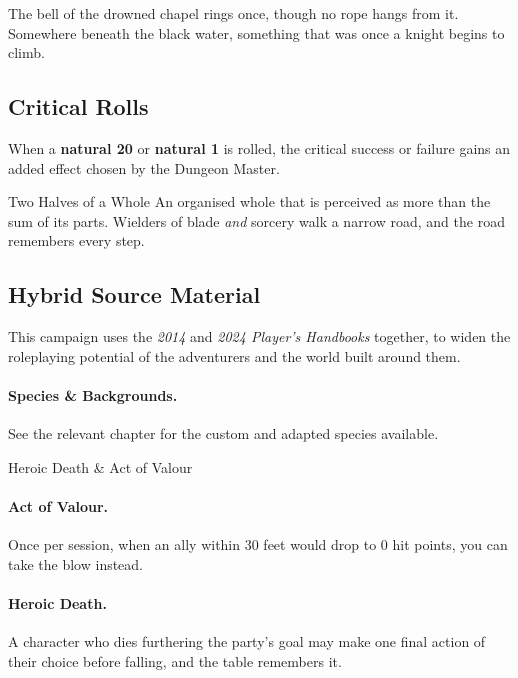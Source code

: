 \documentclass{apotheosis-book} %
\begin{document}
\begin{segment}
\begin{readaloud}
  The bell of the drowned chapel rings once, though no rope hangs from it.
  Somewhere beneath the black water, something that was once a knight
  begins to climb.
\end{readaloud}

\subsection{Critical Rolls}
When a \textbf{natural 20} or \textbf{natural 1} is rolled, the critical
success or failure gains an added effect chosen by the Dungeon Master.


\begin{sidebar}{Two Halves of a Whole}
  An organised whole that is perceived as more than the sum of its parts.
  Wielders of blade \emph{and} sorcery walk a narrow road, and the road
  remembers every step.
\end{sidebar}

\subsection{Hybrid Source Material}
This campaign uses the \emph{2014} and \emph{2024 Player's Handbooks}
together, to widen the roleplaying potential of the adventurers and the
world built around them.

\paragraph{Species \& Backgrounds.} See the relevant chapter for the
custom and adapted species available.
\end{segment}

\begin{variantrule}{Heroic Death \& Act of Valour}
\begin{segment}
  \paragraph{Act of Valour.} Once per session, when an ally within 30 feet
  would drop to 0 hit points, you can take the blow instead.

  \paragraph{Heroic Death.} A character who dies furthering the party's
  goal may make one final action of their choice before falling, and the
  table remembers it.
\end{segment}
\end{variantrule}
\end{document}
